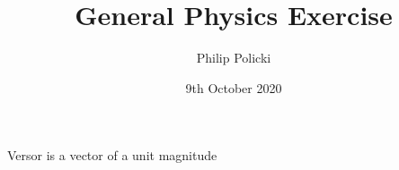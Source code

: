 \documentclass{article}
\title{General Physics Exercise }
\author{Philip Policki}
\date{9th October 2020}
\begin{document}
\maketitle
Versor is a vector of a unit magnitude
\end{document}
